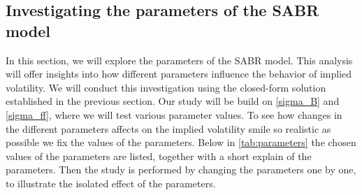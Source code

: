 \subsection{Investigating the parameters of the SABR model}
In this section, we will explore the parameters of the SABR model. This analysis will offer insights into 
how different parameters influence the behavior of implied volatility. We will conduct this investigation using 
the closed-form solution established in the previous section. Our study will be build on  \autoref{sigma_B} and 
\autoref{sigma_ff}, where we will test various parameter values. To see how changes in the different parameters
affects on the implied volatility smile so realistic as possible we fix the values of the parameters.
Below in \autoref{tab:parameters} the chosen values of the parameters are listed, together with a short
explain of the parameters. Then the study is performed by changing the parameters one by one, to illustrate the 
isolated effect of the parameters. 

